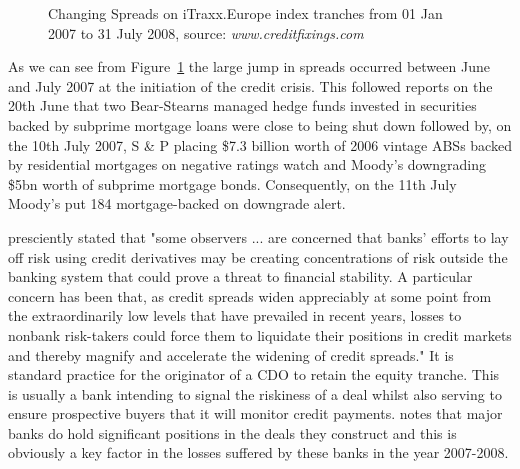 \begin{figure}
\centerline{}
\caption{\label{table:trancheSpread}Changing Spreads on iTraxx.Europe index tranches from 01 Jan 2007 to 31 July 2008, source: \it{www.creditfixings.com}}
\end{figure}


As we can see from Figure~\ref{table:trancheSpread} the large jump in spreads occurred between June and July 2007 at the initiation of the credit crisis.  This followed reports on the 20th June that two Bear-Stearns managed hedge funds invested in securities backed by subprime mortgage loans were close to being shut down followed by, on the 10th July 2007, S \& P placing \$7.3 billion worth of 2006 vintage ABSs backed by residential mortgages on negative ratings watch and Moody's downgrading \$5bn worth of subprime mortgage bonds. Consequently, on the 11th July Moody's put 184 mortgage-backed on downgrade alert.

\cite{Green2005} presciently stated that "some observers ... are concerned that banks' efforts to lay off risk using credit derivatives may be creating concentrations of risk outside the banking system that could prove a threat to financial stability. A particular concern has been that, as credit spreads widen appreciably at some point from the extraordinarily low levels that have prevailed in recent years, losses to nonbank risk-takers could force them to liquidate their positions in credit markets and thereby magnify and accelerate the widening of credit spreads." It is standard practice for the originator of a CDO to retain the equity tranche. This is usually a bank intending to signal the riskiness of a deal whilst also serving to ensure prospective buyers that it will monitor credit payments.  \cite{Eli2006} notes that major banks do hold significant positions in the deals they construct and this is obviously a key factor in the losses suffered by these banks in the year 2007-2008.



